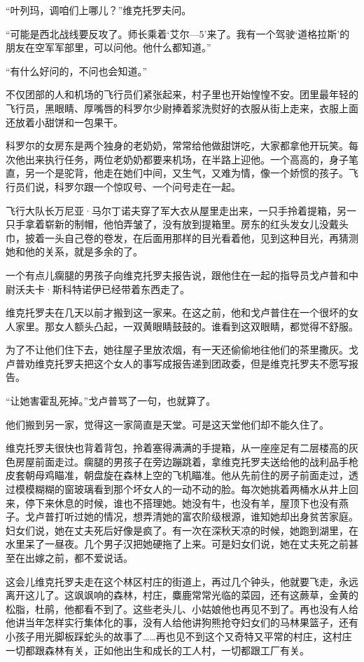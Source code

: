 “叶列玛，调咱们上哪儿？”维克托罗夫问。

“可能是西北战线要反攻了。师长乘着‘艾尔—5’来了。我有一个驾驶‘道格拉斯’的朋友在空军军部里，可以问他。他什么都知道。”

“有什么好问的，不问也会知道。”

不仅团部的人和机场的飞行员们紧张起来，村子里也开始惶惶不安。团里最年轻的飞行员，黑眼睛、厚嘴唇的科罗尔少尉捧着浆洗熨好的衣服从街上走来，衣服上面还放着小甜饼和一包果干。

科罗尔的女房东是两个独身的老奶奶，常常给他做甜饼吃，大家都拿他开玩笑。每次他出来执行任务，两位老奶奶都要来机场，在半路上迎他。一个高高的，身子笔直，另一个是驼背，他走在她们中间，又生气，又难为情，像一个娇惯的孩子。飞行员们说，科罗尔跟一个惊叹号、一个问号走在一起。

飞行大队长万尼亚·马尔丁诺夫穿了军大衣从屋里走出来，一只手拎着提箱，另一只手拿着崭新的制帽，他怕弄皱了，没有放到提箱里。房东的红头发女儿没戴头巾，披着一头自己卷的卷发，在后面用那样的目光看着他，见到这种目光，再猜测她和他的关系，就是多余的了。

一个有点儿瘸腿的男孩子向维克托罗夫报告说，跟他住在一起的指导员戈卢普和中尉沃夫卡·斯科特诺伊已经带着东西走了。

维克托罗夫在几天以前才搬到这一家来。在这之前，他和戈卢普住在一个很坏的女人家里。那女人额头凸起，一双黄眼睛鼓鼓的。谁看到这双眼睛，都觉得不舒服。

为了不让他们住下去，她往屋子里放浓烟，有一天还偷偷地往他们的茶里撒灰。戈卢普劝维克托罗夫把这个女人的事写成报告递到团政委，但是维克托罗夫不愿写报告。

“让她害霍乱死掉。”戈卢普骂了一句，也就算了。

他们搬到另一家，觉得这一家简直是天堂。可是这天堂他们却不能久住了。

维克托罗夫很快也背着背包，拎着塞得满满的手提箱，从一座座足有二层楼高的灰色房屋前面走过。瘸腿的男孩子在旁边蹦跳着，拿维克托罗夫送给他的战利品手枪皮套朝母鸡瞄准，朝盘旋在森林上空的飞机瞄准。他从先前住的房子前面走过，透过模模糊糊的窗玻璃看到那个坏女人的一动不动的脸。每次她挑着两桶水从井上回来，停下来休息的时候，谁也不搭理她。她没有牛，也没有羊，屋顶下也没有燕子。戈卢普打听过她的情况，想弄清她的富农阶级根源，谁知她却出身贫苦家庭。妇女们说，她在丈夫死后好像是疯了。有一次在深秋天凉的时候，她跑到湖里，在水里呆了一昼夜。几个男子汉把她硬拖了上来。可是妇女们说，她在丈夫死之前甚至在出嫁之前，都不爱说话。

这会儿维克托罗夫走在这个林区村庄的街道上，再过几个钟头，他就要飞走，永远离开这儿了。这飒飒响的森林，村庄，麋鹿常常光临的菜园，还有这蕨草，金黄的松脂，杜鹃，他都看不到了。这些老头儿、小姑娘他也再见不到了。再也没有人给他讲当年怎样实行集体化的事，没有人给他讲狗熊抢夺妇女们的马林果篮子，还有小孩子用光脚板踩蛇头的故事了……再也见不到这个又奇特又平常的村庄，这村庄一切都跟森林有关，正如他出生和成长的工人村，一切都跟工厂有关。

